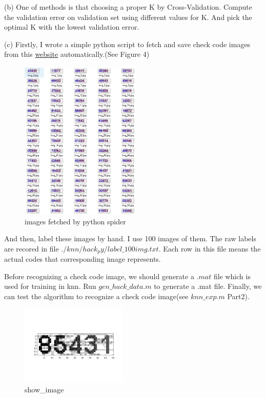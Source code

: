 \documentclass[11pt]{article} %
\begin{document}
(b) 
One of methods is that choosing a proper K by Cross-Validation. Compute the validation error on validation set using different values for K. And pick the optimal K with the lowest validation error.

(c)
Firstly, I wrote a simple python script to fetch and save check code images from this \href{http://jwbinfosys.zju.edu.cn/default2.aspx}{website} automatically.(See Figure 4)

\begin{figure}
\centering
\includegraphics[height=3in]{knn_spider.jpg}  %
\caption{images fetched by python spider}
\label{fig4}
\end{figure}

And then, label these images by hand. I use 100 images of them. The raw labels are recored in file  $./knn/hack_py/label\_100img.txt$. Each row in this file means the actual codes that corresponding image represents.

Before recognizing a check code image, we should generate a $.mat$ file which is used for training in knn. Run $gen\_hack\_data.m$ to generate a .mat file.
Finally, we can test the algorithm to recognize a check code image(see $knn\_exp.m$ Part2).

\begin{figure}
\centering
\includegraphics[width=2in]{knn_showimg.jpg}  %
\caption{show\_image}
\label{fig5}
\end{figure}
\end{document}
